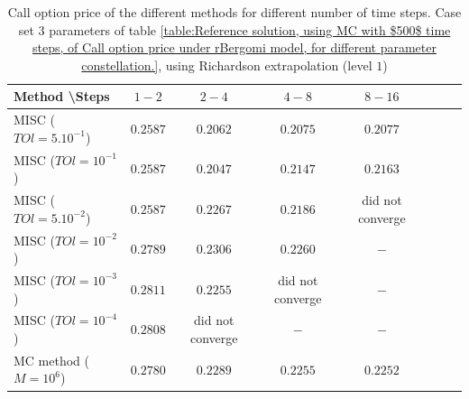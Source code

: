 \documentclass[11pt]{article}
\begin{document}
\begin{table}[h!]
\centering
\begin{tabular}{l*{6}{c}r}
Method \textbackslash  Steps    &$1-2$         & $2-4$ & $4-8$ & $8-16$\\
\hline
MISC ($TOl=5.10^{-1}$)& $0.2587$  & $0.2062$ & $0.2075$ & $0.2077$ \\
MISC ($TOl=10^{-1}$)  &$0.2587$  &$0.2047$ & $0.2147$ & $0.2163$  \\
MISC ($TOl=5.10^{-2}$)  & $0.2587$ & $0.2267$ & $0.2186$ &did not converge  \\
MISC ($TOl=10^{-2}$)  & $0.2789$ &$0.2306$ & $0.2260$ & $-$  \\
MISC ($TOl=10^{-3}$)  & $0.2811$ &$0.2255$ & did not converge & $-$  \\
MISC ($TOl=10^{-4}$)  & $0.2808$ &did not converge & $-$ & $-$  \\
\hline
MC method ($M=10^6$)  &$   0.2780$ & $0.2289$ & $ 0.2255$ & $0.2252$ \\
\hline
\end{tabular}
\caption{Call option price of the different methods for different number of time steps. Case set $3$ parameters of table \ref{table:Reference solution, using MC with $500$ time steps, of Call option price under rBergomi model, for different parameter constellation.}, using Richardson extrapolation (level $1$)}
\label{table:  Call option price of the different methods for different number of time steps. Case set $3$ parameter, using Richardson extrapolation (level $1$)}
\end{table}
\end{document}
